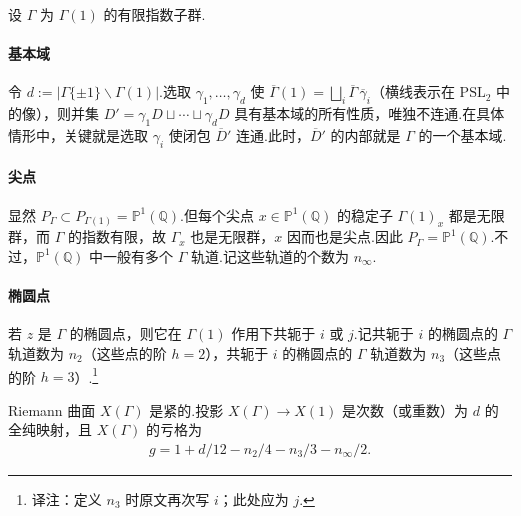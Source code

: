设 $\Gamma$ 为 $\Gamma(1)$ 的有限指数子群.



\paragraph{基本域}令 $d:=|\Gamma\{\pm1\}\backslash\Gamma(1)|$.选取 $\gamma_1,\ldots,\gamma_d$ 使 $\overline\Gamma(1)=\bigsqcup_i\overline\Gamma\,\overline\gamma_i$（横线表示在 $\mathrm{PSL}_2$ 中的像），则并集 $D'=\gamma_1D\sqcup\cdots\sqcup\gamma_dD$ 具有基本域的所有性质，唯独不连通.在具体情形中，关键就是选取 $\gamma_i$ 使闭包 $\overline D'$ 连通.此时，$\overline D'$ 的内部就是 $\Gamma$ 的一个基本域.

\paragraph{尖点}显然 $P_\Gamma\subset P_{\Gamma(1)}=\mathbb P^1(\mathbb Q)$.但每个尖点 $x\in\mathbb P^1(\mathbb Q)$ 的稳定子 $\Gamma(1)_x$ 都是无限群，而 $\Gamma$ 的指数有限，故 $\Gamma_x$ 也是无限群，$x$ 因而也是尖点.因此 $P_\Gamma=\mathbb P^1(\mathbb Q)$.不过，$\mathbb P^1(\mathbb Q)$ 中一般有多个 $\Gamma$ 轨道.记这些轨道的个数为 $n_\infty$.

\paragraph{椭圆点}若 $z$ 是 $\Gamma$ 的椭圆点，则它在 $\Gamma(1)$ 作用下共轭于 $i$ 或 $j$.记共轭于 $i$ 的椭圆点的 $\Gamma$ 轨道数为 $n_2$（这些点的阶 $h=2$），共轭于 $i$ 的椭圆点的 $\Gamma$ 轨道数为 $n_3$（这些点的阶 $h=3$）.\footnote{译注：定义 $n_3$ 时原文再次写 $i$；此处应为 $j$.}

\begin{theorem*}

Riemann 曲面 $X(\Gamma)$ 是紧的.投影 $X(\Gamma)\longrightarrow X(1)$ 是次数（或重数）为 $d$ 的全纯映射，且 $X(\Gamma)$ 的亏格为
\begin{align*}
g=1+d/12-n_2/4-n_3/3-n_\infty/2.
\end{align*}
\end{theorem*}

